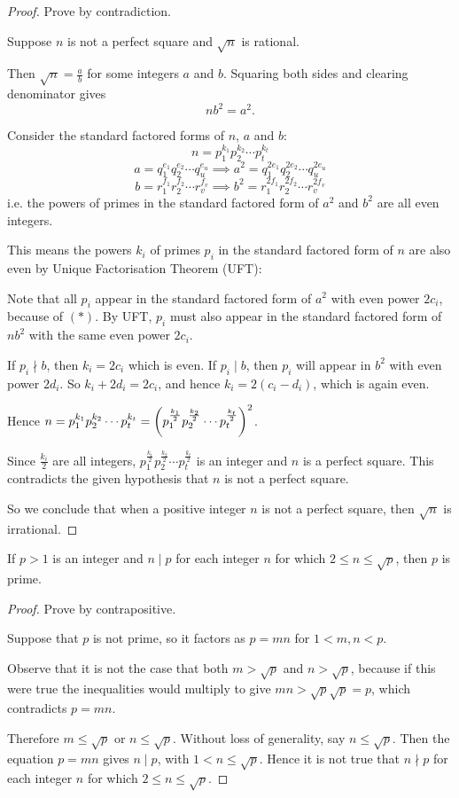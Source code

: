 \begin{proof}
Prove by contradiction.

Suppose $n$ is not a perfect square and $\sqrt{n}$ is rational.

Then $\sqrt{n}=\frac{a}{b}$ for some integers $a$ and $b$. Squaring both sides and clearing denominator gives 
\begin{equation*}\tag{$\ast$}
nb^2=a^2.
\end{equation*}

Consider the standard factored forms of $n$, $a$ and $b$:
\[ n=p_1^{k_1}p_2^{k_2}\cdots p_t^{k_t} \]
\[ a=q_1^{e_1}q_2^{e_2}\cdots q_u^{e_u} \implies a^2=q_1^{2e_1}q_2^{2e_2}\cdots q_u^{2e_u} \]
\[ b=r_1^{f_1}r_2^{f_2}\cdots r_v^{f_v} \implies b^2=r_1^{2f_1}r_2^{2f_2}\cdots r_v^{2f_v} \]
i.e. the powers of primes in the standard factored form of $a^2$ and $b^2$ are all even integers. 

This means the powers $k_i$ of primes $p_i$ in the standard factored form of $n$ are also even by Unique Factorisation Theorem (UFT):

Note that all $p_i$ appear in the standard factored form of $a^2$ with even power $2c_i$, because of $(\ast)$. By UFT, $p_i$ must also appear in the standard factored form of $nb^2$ with the same even power $2c_i$.

If $p_i\nmid b$, then $k_i=2c_i$ which is even. If $p_i\mid b$, then $p_i$ will appear in $b^2$ with even power $2d_i$. So $k_i+2d_i=2c_i$, and hence $k_i=2(c_i-d_i)$, which is again even.

Hence $n=p_1^{k_1}p_2^{k_2}\cdots p_t^{k_t}=\left(p_1^{\frac{k_1}{2}}p_2^{\frac{k_2}{2}}\cdots p_t^{\frac{k_t}{2}}\right)^2$.

Since $\frac{k_i}{2}$ are all integers, $p_1^{\frac{k_1}{2}}p_2^{\frac{k_2}{2}}\cdots p_t^{\frac{k_t}{2}}$ is an integer and $n$ is a perfect square. This contradicts the given hypothesis that $n$ is not a perfect square.

So we conclude that when a positive integer $n$ is not a perfect square, then $\sqrt{n}$ is irrational.
\end{proof}

\begin{prbm}
If $p>1$ is an integer and $n\mid p$ for each integer $n$ for which $2\le n\le\sqrt{p}$, then $p$ is prime.
\end{prbm}

\begin{proof}
Prove by contrapositive.

Suppose that $p$ is not prime, so it factors as $p=mn$ for $1<m,n<p$.

Observe that it is not the case that both $m>\sqrt{p}$ and $n>\sqrt{p}$, because if this were true the inequalities would multiply to give $mn>\sqrt{p}\sqrt{p}=p$, which contradicts $p=mn$.

Therefore $m\le\sqrt{p}$ or $n\le\sqrt{p}$. Without loss of generality, say $n\le\sqrt{p}$. Then the equation $p=mn$ gives $n\mid p$, with $1<n\le\sqrt{p}$. Hence it is not true that $n\nmid p$ for each integer $n$ for which $2\le n\le\sqrt{p}$.
\end{proof}

